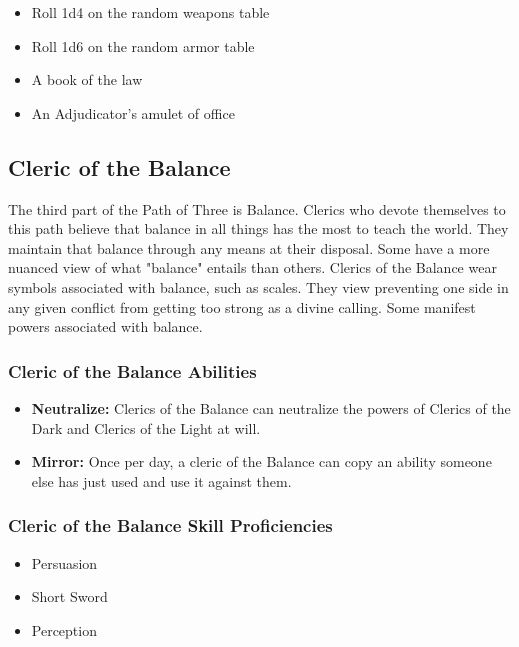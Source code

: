 \begin{multicols}{2}
\begin{itemize}
  \item Roll 1d4 on the random weapons table
  \item Roll 1d6 on the random armor table
  \item A book of the law
  \item An Adjudicator's amulet of office
\end{itemize}

\subsection{Cleric of the Balance}

The third part of the Path of Three is Balance. Clerics who devote themselves to
this path believe that balance in all things has the most to teach the world.
They maintain that balance through any means at their disposal. Some have a more
nuanced view of what "balance" entails than others. Clerics of the Balance wear
symbols associated with balance, such as scales. They view preventing one side
in any given conflict from getting too strong as a divine calling. Some manifest
powers associated with balance.

\subsubsection{Cleric of the Balance Abilities}

\begin{itemize}
  \item \textbf{Neutralize:} Clerics of the Balance can neutralize the powers of
    Clerics of the Dark and Clerics of the Light at will.
  \item \textbf{Mirror:} Once per day, a cleric of the Balance can copy an ability
    someone else has just used and use it against them.
\end{itemize}

\subsubsection{Cleric of the Balance Skill Proficiencies}

\begin{itemize}
  \item Persuasion
  \item Short Sword
  \item Perception
\end{itemize}


\end{multicols}
